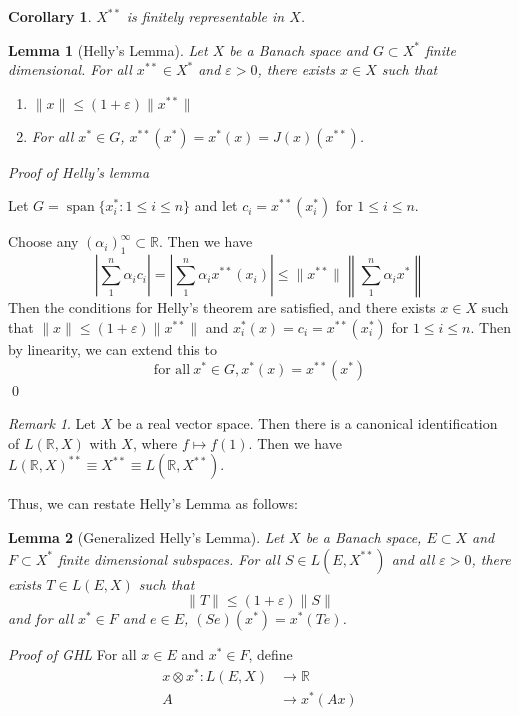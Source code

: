 \documentclass[11pt, reqno]{article}
\theoremstyle{plain}
\newtheorem*{lemma}{Lemma}
\newtheorem*{corollary}{Corollary}
\theoremstyle{definition}
\theoremstyle{remark}
\newtheorem*{remark}{Remark}
\renewcommand{\epsilon}{\varepsilon}
\newcommand{\RR}{\mathbb{R}}
\begin{document}
\begin{corollary}
    $X^{**}$ is finitely representable in $X$.
\end{corollary}

\begin{lemma}[Helly's Lemma]
    Let $X$ be a Banach space and $G \subset X^*$ finite dimensional. For all $x^{**} \in X^*$ and $\epsilon > 0$,
    there exists $x \in X$ such that 
    \begin{enumerate}
        \item $\|x\| \leq (1 + \epsilon)\|x^{**}\|$
        \item For all $x^* \in G$, $x^{**}(x^*) = x^*(x) = J(x)(x^{**})$.
    \end{enumerate}
\end{lemma}

\textit{Proof of Helly's lemma} 

Let $G = \operatorname{span}\{x^*_i: 1 \leq i \leq n\}$ and let $c_i = x^{**}(x_i^*)$ for $1 \leq i \leq n$.

Choose any $(\alpha_i)_1^\infty \subset \RR$. Then we have 
\[
    \left|\sum_1^n \alpha_i c_i\right| = \left|\sum_1^n \alpha_i x^{**}(x_i)\right| \leq \|x^{**}\|\left\|\sum_1^n \alpha_i x^*\right\|
\]
Then the conditions for Helly's theorem are satisfied, and there exists $x \in X$ such that $\|x\| \leq (1 + \epsilon)\|x^{**}\|$
and $x_i^*(x) = c_i = x^{**}(x_i^*)$ for $1 \leq i \leq n$. Then by linearity, we can extend this to 
\[
    \text{for all}\ x^* \in G, x^*(x) = x^{**}(x^*)
\]
\hfill\qed

\begin{remark}
    Let $X$ be a real vector space. Then there is a canonical identification of $L(\RR, X)$ with $X$, where 
    $f \mapsto f(1)$. Then we have $L(\RR,X)^{**} \equiv X^{**} \equiv L(\RR, X^{**})$. 
\end{remark}

Thus, we can restate Helly's Lemma as follows:
\begin{lemma}[Generalized Helly's Lemma]
    Let $X$ be a Banach space, $E \subset X$ and $F \subset X^*$ finite dimensional subspaces. For all $S \in L(E, X^{**})$
    and all $\epsilon > 0$, there exists $T \in L(E, X)$ such that 
    \[
        \|T\| \leq (1 + \epsilon)\|S\|
    \]
    and for all $x^* \in F$ and $e \in E$, $(Se)(x^*) = x^*(Te)$.
\end{lemma}

\textit{Proof of GHL}
For all $x \in E$ and $x^* \in F$, define 
\begin{align*}
    x \otimes x^*: L(E, X)& \rightarrow \RR\\
    A &\rightarrow x^*(Ax)
\end{align*}
\end{document}
